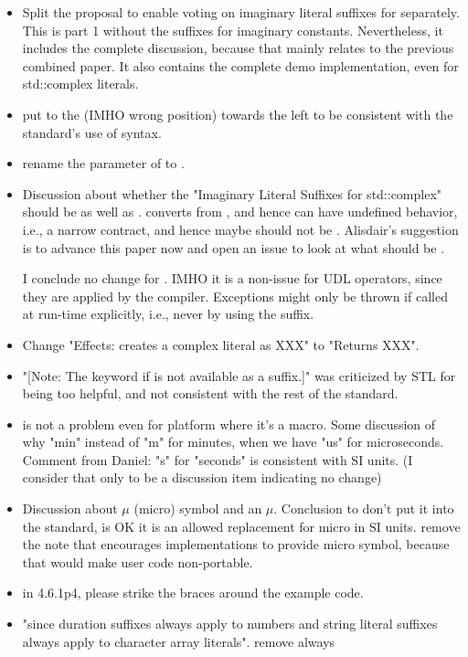 \documentclass[ebook,11pt,article]{memoir}
\begin{document}
\begin{itemize}
\item Split the proposal to enable voting on imaginary literal suffixes for  separately. This is part 1 without the suffixes for  imaginary constants. Nevertheless, it includes the complete discussion, because that mainly relates to the previous combined paper. It also contains the complete demo implementation, even for std::complex literals.
\item put  to the (IMHO wrong position) towards the left to be consistent with the standard's use of syntax.
\item rename the parameter  of  to .
\item Discussion about whether the "Imaginary Literal Suffixes for std::complex" should be  as well as .    converts from , and hence can have undefined behavior, i.e., a narrow contract, and hence maybe should not be .  Alisdair’s suggestion is to advance this paper now and open an issue to look at what should be . 

I conclude no change for . IMHO it is a non-issue for  UDL operators, since they are applied by the compiler. Exceptions might only be thrown if called at run-time explicitly, i.e.,  never by using the suffix.
\item  Change "Effects: creates a complex literal as XXX" to "Returns XXX". %
\item "[Note: The keyword if is not available as a suffix.]" was criticized by STL for being too helpful, and not consistent with the rest of the standard. %
\item {} is not a problem even for platform where it’s a macro. Some discussion of why "min" instead of "m" for minutes, when we have "us" for microseconds. Comment from Daniel: "s" for "seconds" is consistent with SI units.
 (I consider that only to be a discussion item indicating no change)
\item Discussion about $\mu$ (micro) symbol and an $\mu$. Conclusion to don't put it into the standard,  is OK it is an allowed replacement for micro in SI units. remove the note that encourages implementations to provide micro symbol, because that would make user code non-portable. %
\item in 4.6.1p4, please strike the braces around the example code. %
\item  "since duration suffixes always apply to numbers and string literal suffixes always apply to character array literals". remove always %

\end{itemize}
\end{document}

